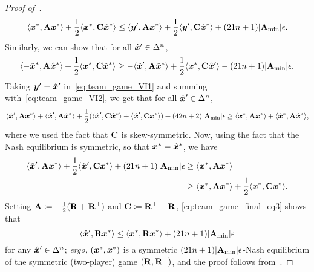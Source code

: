 \begin{proof}[Proof of~]
\begin{align}
        \langle {\bm{x}}^*, \mathbf{A} {\bm{x}}^* \rangle + \frac{1}{2} \langle {\bm{x}}^*, \mathbf{C} \hat{{\bm{x}}}^* \rangle \leq \langle {\bm{y}}', \mathbf{A} {\bm{x}}^* \rangle + \frac{1}{2} \langle {\bm{y}}', \mathbf{C} \hat{{\bm{x}}}^* \rangle + (21n + 1 ) |\mathbf{A}_{\min}|\epsilon. \label{eq:team_game_VI1}
    \end{align}
    Similarly, we can show that for all $\hat{{\bm{x}}}' \in \Delta^n$,
    \begin{align}
        \langle -\hat{{\bm{x}}}^*, \mathbf{A} \hat{{\bm{x}}}^* \rangle + \frac{1}{2} \langle {\bm{x}}^*, \mathbf{C} \hat{{\bm{x}}}^* \rangle \geq - \langle \hat{{\bm{x}}}', \mathbf{A} \hat{{\bm{x}}}^* \rangle + \frac{1}{2} \langle {\bm{x}}^*, \mathbf{C} \hat{{\bm{x}}}' \rangle - (21n + 1) |\mathbf{A}_{\min}| \epsilon. \label{eq:team_game_VI2}
    \end{align}
    Taking ${\bm{y}}' = \hat{{\bm{x}}}'$ in~\eqref{eq:team_game_VI1} and summing with~\eqref{eq:team_game_VI2}, we get that for all $\hat{{\bm{x}}}' \in \Delta^n$,
\begin{equation*}
        \langle \hat{{\bm{x}}}', \mathbf{A} {\bm{x}}^* \rangle + 
\langle \hat{{\bm{x}}}', \mathbf{A} \hat{{\bm{x}}}^* \rangle + \frac{1}{2} (\langle \hat{{\bm{x}}}', \mathbf{C} \hat{{\bm{x}}}^* \rangle +  \langle \hat{{\bm{x}}}', \mathbf{C} {\bm{x}}^* \rangle) + (42n + 2) |\mathbf{A}_{\min}| \epsilon \geq \langle {\bm{x}}^*, \mathbf{A} {\bm{x}}^* \rangle + \langle \hat{{\bm{x}}}^*, \mathbf{A} \hat{{\bm{x}}}^* \rangle,
\end{equation*}
    where we used the fact that $\mathbf{C}$ is skew-symmetric. Now, using the fact that the Nash equilibrium is symmetric, so that ${\bm{x}}^* = \hat{{\bm{x}}}^*$, we have
\begin{align}
        \langle \hat{{\bm{x}}}', \mathbf{A} {\bm{x}}^* \rangle + \frac{1}{2} \langle \hat{{\bm{x}}}', \mathbf{C} {\bm{x}}^* \rangle + (21n + 1) |\mathbf{A}_{\min}| \epsilon &\geq \langle {\bm{x}}^*, \mathbf{A} {\bm{x}}^* \rangle \notag \\
        &\geq \langle {\bm{x}}^*, \mathbf{A} {\bm{x}}^* \rangle + \frac{1}{2} \langle {\bm{x}}^*, \mathbf{C} {\bm{x}}^* \rangle. \label{eq:team_game_final_eq3}
    \end{align}
    Setting $\mathbf{A} \coloneqq - \frac{1}{2} (\mathbf{R} + \mathbf{R}^\top)$ and $\mathbf{C} \coloneqq \mathbf{R}^\top - \mathbf{R}$, \eqref{eq:team_game_final_eq3} shows that 
    \begin{equation*}
        \langle \hat{{\bm{x}}}', \mathbf{R} {\bm{x}}^* \rangle \leq \langle {\bm{x}}^*, \mathbf{R} {\bm{x}}^* \rangle + (21n + 1) |\mathbf{A}_{\min}| \epsilon
    \end{equation*}
    for any $\hat{{\bm{x}}}' \in \Delta^n$; \emph{ergo}, $({\bm{x}}^*, {\bm{x}}^*)$ is a symmetric $(21n + 1)  |\mathbf{A}_{\min}| \epsilon$-Nash equilibrium of the symmetric (two-player) game $(\mathbf{R}, \mathbf{R}^\top)$, and the proof follows from~.
\end{proof}

